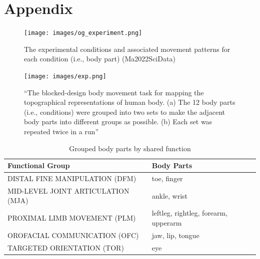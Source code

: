 \documentclass{article}
\begin{document}




\appendix
\renewcommand{\thefigure}{A\arabic{figure}} %
\setcounter{figure}{0} %

\renewcommand{\thetable}{B\arabic{table}} %
\setcounter{table}{0} %

\section*{Appendix}

\captionsetup[figure]{list=false} %

\begin{figure}[h]
    \centering
    \texttt{[image: images/og\_experiment.png]}
    \caption{The experimental conditions and associated movement patterns for each condition (i.e., body part) (Ma2022SciData)}
    \label{fig:og-exp}
\end{figure}

\begin{figure}[h]
    \centering
    \texttt{[image: images/exp.png]}
    \caption{``The blocked-design body movement task for mapping the topographical representations of human body. (a) The 12 body parts (i.e., conditions) were grouped into two sets to make the adjacent body parts into different groups as possible. (b) Each set was repeated twice in a run'' \cite{data}}
    \label{fig:exp}
\end{figure}

\begin{table}[h]
\centering
\begin{tabular}{|l|l|}
\hline
\textbf{Functional Group} & \textbf{Body Parts} \\
\hline
DISTAL FINE MANIPULATION (DFM) & toe, finger \\
MID-LEVEL JOINT ARTICULATION (MJA) & ankle, wrist \\
PROXIMAL LIMB MOVEMENT (PLM) & leftleg, rightleg, forearm, upperarm \\
OROFACIAL COMMUNICATION (OFC) & jaw, lip, tongue \\
TARGETED ORIENTATION (TOR) & eye \\
\hline
\end{tabular}
\caption{Grouped body parts by shared function}
\label{tab:grouped_first}
\end{table}
\end{document}
